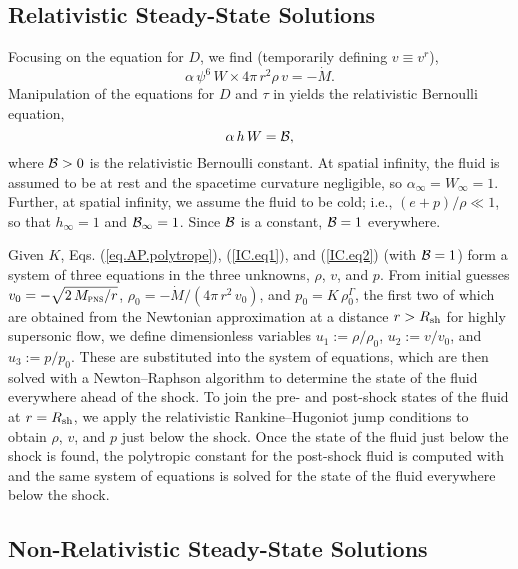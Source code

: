 \subsection{Relativistic Steady-State Solutions}

Focusing on the equation for $D$, we find
(temporarily defining $v\equiv v^{r}$),
\begin{equation}
  \alpha\,\psi^{6}\,W \times 4\pi\,r^{2}\rho\,v=-\dot{M}.
  \label{IC.eq1}
\end{equation}
Manipulation of the equations for $D$ and $\tau$
in  yields the relativistic Bernoulli equation,
\begin{equation}
  \alpha\,h\,W=\mathcal{B},
  \label{IC.eq2}
\end{equation}
where $\mathcal{B}>0$ is the relativistic Bernoulli constant.
At spatial infinity, the fluid is assumed to be at rest and the spacetime
curvature negligible, so $\alpha_{\infty}=W_{\infty}=1$.
Further, at spatial infinity, we assume the fluid to be cold; i.e.,
$\left(e+p\right)/\rho\ll1$,
so that $h_{\infty}=1$ and $\mathcal{B}_{\infty}=1$.
Since $\mathcal{B}$ is a constant, $\mathcal{B}=1$ everywhere.

Given $K$, Eqs. (\ref{eq.AP.polytrope}), (\ref{IC.eq1}),
and (\ref{IC.eq2}) (with $\mathcal{B}=1$)
form a system of three equations in the three unknowns,
$\rho$, $v$, and $p$.
From initial guesses $v_{0}=-\sqrt{2\,M_{\textsc{pns}}/r}$,
$\rho_{0}=-\dot{M}/\left(4\pi\,r^{2}\,v_{0}\right)$, and
$p_{0}=K\,\rho_{0}^{\Gamma}$, the first two of which are obtained
from the Newtonian approximation at a distance $r>R_{\mathrm{sh}}$ for
highly supersonic flow,
we define dimensionless variables
$u_{1}:=\rho/\rho_{0}$, $u_{2}:=v/v_{0}$, and $u_{3}:=p/p_{0}$.
These are substituted into the system of equations, which are then solved
with a Newton--Raphson algorithm to determine the state of the fluid everywhere
ahead of the shock.
To join the pre- and post-shock states of the fluid at $r=R_{\mathrm{sh}}$,
we apply the relativistic Rankine--Hugoniot jump conditions
\citep[i.e., the Taub jump conditions,][]{t1948}
to obtain $\rho$, $v$, and $p$ just below the shock.
Once the state of the fluid just below the shock is found,
the polytropic constant for the post-shock fluid is computed
with 
and the same system of equations is solved for
the state of the fluid everywhere below the shock.

\subsection{Non-Relativistic Steady-State Solutions}

